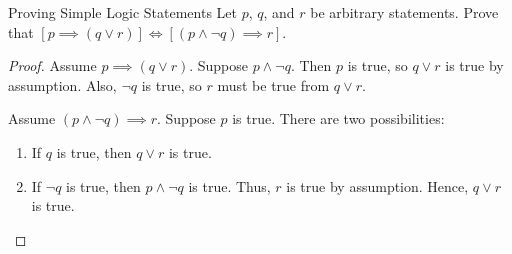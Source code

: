 \begin{exbox}{Proving Simple Logic Statements}{}
    Let $p$, $q$, and $r$ be arbitrary statements. Prove that $\left[ p \implies (q \lor r) \right] \iff \left[ (p \land \neg q) \implies r \right]$.
    \tcblower
    \begin{proof}
        Assume $p \implies (q \lor r)$. Suppose $p \land \neg q$. Then $p$ is true, so $q \lor r$ is true by assumption. Also, $\neg q$ is true, so $r$ must be true from $q \lor r$.

        Assume $(p \land \neg q) \implies r$. Suppose $p$ is true. There are two possibilities:
        \begin{enumerate}
            \item If $q$ is true, then $q \lor r$ is true.
            \item If $\neg q$ is true, then $p \land \neg q$ is true. Thus, $r$ is true by assumption. Hence, $q \lor r$ is true.
        \end{enumerate}
    \end{proof}
\end{exbox}


